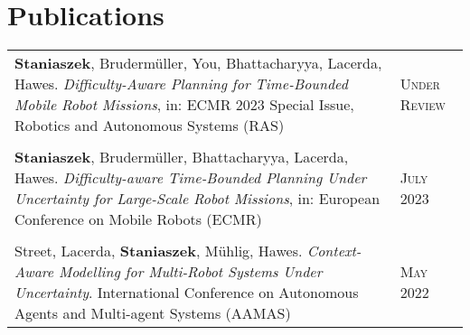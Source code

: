 \documentclass[a4paper,10pt]{article}
\newcommand{\datelen}{1.8cm}
\newcommand{\descrlen}{15.5cm}
\begin{document}
\section{Publications}
\begin{tabular}{p{\descrlen}|p{\datelen}}
    \textbf{Staniaszek}, Brudermüller, You, Bhattacharyya, Lacerda, Hawes. \emph{Difficulty-Aware Planning for Time-Bounded Mobile Robot Missions}, in:  ECMR 2023 Special Issue, Robotics and Autonomous Systems (RAS)&\textsc{Under Review}\\\multicolumn{2}{c}{}\\[-0.2cm]
  \textbf{Staniaszek}, Brudermüller, Bhattacharyya, Lacerda, Hawes. \emph{Difficulty-aware Time-Bounded Planning Under Uncertainty for Large-Scale Robot Missions}, in: European Conference on Mobile Robots (ECMR)&\textsc{July 2023}\\\multicolumn{2}{c}{}\\[-0.2cm]
  Street, Lacerda, \textbf{Staniaszek}, Mühlig, Hawes. \emph{Context-Aware Modelling for Multi-Robot Systems Under Uncertainty}. International Conference on Autonomous Agents and Multi-agent Systems (AAMAS) & \textsc{May 2022}\\

\end{tabular}
\end{document}
